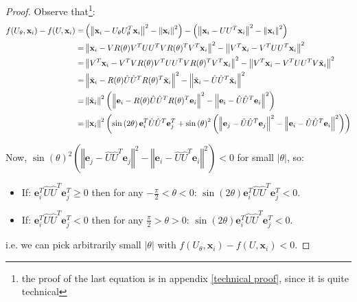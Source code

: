 \documentclass{article}
\newcommand{\x}{{\mathbf x}}
\newcommand{\e}{{\mathbf e}}
\begin{document}
\begin{proof}
Observe that\footnote{the proof of the last equation is in appendix \ref{technical proof}, since it is quite technical}:
\begin{align*}
    f(U_{\theta},\x_i)-f(U,\x_i)
    =&\left(\left\Vert\x_{i}-U_{\theta}U_{\theta}^{T}\x_{i}\right\Vert^{2}-\left\Vert\x_{i}\right\Vert^{2}\right)-\left(\left\Vert\x_{i}-UU^{T}\x_{i}\right\Vert^{2}-\left\Vert\x_{i}\right\Vert^{2}\right)\\
    =&\left\Vert\x_{i}-VR(\theta)V^TUU^{T}VR(\theta)^{T}V^T\x_{i}\right\Vert^{2}-\left\Vert V^T\x_{i}-V^TUU^{T}\x_{i}\right\Vert^{2}\\
    =&\left\Vert V^T\x_{i}-V^TVR(\theta)V^TUU^{T}VR(\theta)^{T}V^T\x_{i}\right\Vert^{2}-\left\Vert V^T\x_{i}-V^TUU^{T}V\Tilde{\x}_{i}\right\Vert^{2}\\
    =&\left\Vert \Tilde{\x}_{i}-R(\theta)\hat{U}\hat{U}^TR(\theta)^{T}\Tilde{\x}_{i}\right\Vert^{2}-\left\Vert \Tilde{\x}_{i}-\hat{U}\hat{U}^{T}\Tilde{\x}_{i}\right\Vert^{2}\\
    =&\left\Vert\Tilde{\x}_{i}\right\Vert^{2}\left(\left\Vert\e_{i}-R(\theta)\hat{U}\hat{U}^TR(\theta)^{T}\e_{i}\right\Vert ^{2}-\left\Vert\e_{i}-\hat{U}\hat{U}^{T}\e_{i}\right\Vert^{2}\right)\\
    =& \left\Vert\x_{i}\right\Vert^{2}\left(\sin\left(2\theta\right)\e_{i}^{T}\hat{U}\hat{U}^{T}\e_{j}^{T}+\sin\left(\theta\right)^{2}\left(\left\Vert\e_{j}-\hat{U}\hat{U}^{T}\e_{j}\right\Vert^{2}-\left\Vert\e_{i}-\hat{U}\hat{U}^{T}\e_{i}\right\Vert^{2}\right)\right)
\end{align*}

Now, $\sin\left(\theta\right)^{2}\left(\left\Vert\e_{j}-\hat{U}\hat{U}^{T}\e_{j}\right\Vert^{2}-\left\Vert\e_{i}-\hat{U}\hat{U}^{T}\e_{i}\right\Vert^{2}\right)<0$ for small $|\theta|$, so:

\begin{itemize}
    \item If: $\e_{i}^{T}\hat{U}\hat{U}^{T}\e_{j}^{T} \ge 0$ then for any $-\frac{\pi}{2}<\theta<0$:  $\sin\left(2\theta\right)\e_{i}^{T}\hat{U}\hat{U}^{T}\e_{j}^{T}<0$.
    \item If: $\e_{i}^{T}\hat{U}\hat{U}^{T}\e_{j}^{T} < 0$ then for any $\frac{\pi}{2}>\theta>0$:  $\sin\left(2\theta\right)\e_{i}^{T}\hat{U}\hat{U}^{T}\e_{j}^{T}<0$.
\end{itemize}
i.e. we can pick arbitrarily small $|\theta|$ with $f(U_{\theta},\x_i)-f(U,\x_i)<0$.
\end{proof}
\end{document}
